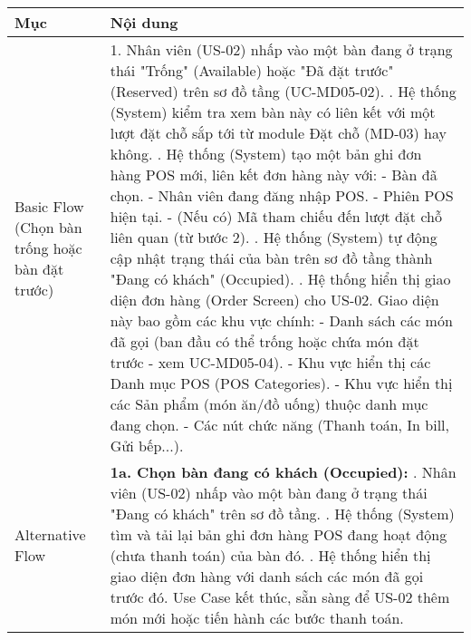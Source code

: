 \begin{longtable}{|m{4cm}|p{11cm}|}
\hline
\textbf{Mục} & \textbf{Nội dung} \\
\hline
Basic Flow (Chọn bàn trống hoặc bàn đặt trước) & 1. Nhân viên (US-02) nhấp vào một bàn đang ở trạng thái "Trống" (Available) hoặc "Đã đặt trước" (Reserved) trên sơ đồ tầng (UC-MD05-02). \newline 2. Hệ thống (System) kiểm tra xem bàn này có liên kết với một lượt đặt chỗ sắp tới từ module Đặt chỗ (MD-03) hay không. \newline 3. Hệ thống (System) tạo một bản ghi đơn hàng POS mới, liên kết đơn hàng này với: \newline    - Bàn đã chọn. \newline    - Nhân viên đang đăng nhập POS. \newline    - Phiên POS hiện tại. \newline    - (Nếu có) Mã tham chiếu đến lượt đặt chỗ liên quan (từ bước 2). \newline 4. Hệ thống (System) tự động cập nhật trạng thái của bàn trên sơ đồ tầng thành "Đang có khách" (Occupied). \newline 5. Hệ thống hiển thị giao diện đơn hàng (Order Screen) cho US-02. Giao diện này bao gồm các khu vực chính: \newline    - Danh sách các món đã gọi (ban đầu có thể trống hoặc chứa món đặt trước - xem UC-MD05-04). \newline    - Khu vực hiển thị các Danh mục POS (POS Categories). \newline    - Khu vực hiển thị các Sản phẩm (món ăn/đồ uống) thuộc danh mục đang chọn. \newline    - Các nút chức năng (Thanh toán, In bill, Gửi bếp...). \\
\hline
Alternative Flow & \textbf{1a. Chọn bàn đang có khách (Occupied):} \newline    1. Nhân viên (US-02) nhấp vào một bàn đang ở trạng thái "Đang có khách" trên sơ đồ tầng. \newline    2. Hệ thống (System) tìm và tải lại bản ghi đơn hàng POS đang hoạt động (chưa thanh toán) của bàn đó. \newline    3. Hệ thống hiển thị giao diện đơn hàng với danh sách các món đã gọi trước đó. Use Case kết thúc, sẵn sàng để US-02 thêm món mới hoặc tiến hành các bước thanh toán. \\
\hline

\end{longtable}
